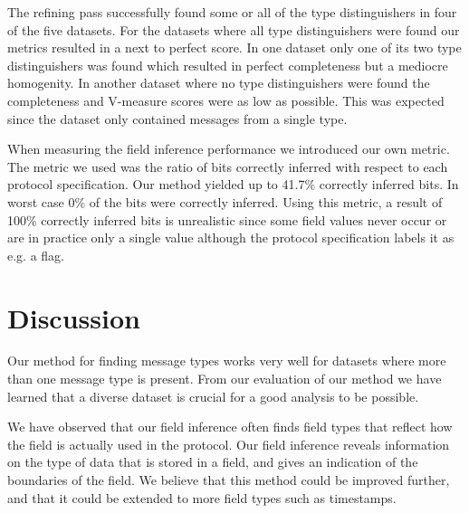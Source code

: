 \documentclass[a4paper,twocolumn]{article}
\begin{document}
The refining pass successfully found some or all of the type distinguishers
in four of the five datasets. For the datasets where all type distinguishers
were found our metrics resulted in a next to perfect score. In one dataset
only one of its two type distinguishers was found which resulted in perfect
completeness but a mediocre homogenity. In another dataset where no
type distinguishers were found the completeness and V-measure scores were as
low as possible. This was expected since the dataset only contained messages
from a single type.

When measuring the field inference performance we introduced our own metric.
The metric we used was the ratio of bits correctly inferred with respect to
each protocol specification. Our method yielded up to 41.7\% correctly
inferred bits. In worst case 0\% of the bits were correctly inferred.
Using this metric, a result of 100\% correctly inferred bits is unrealistic
since some field values never occur or are in practice only a single value
although the protocol specification labels it as e.g. a flag.

\section{Discussion}
Our method for finding message types works very well for datasets where more
than one message type is present. From our evaluation of our method we have
learned that a diverse dataset is crucial for a good analysis to be possible.

We have observed that our field inference often finds field types that reflect
how the field is actually used in the protocol. Our field inference reveals
information on the type of data that is stored in a field, and gives an
indication of the boundaries of the field. We believe that this method could
be improved further, and that it could be extended to more field types such
as timestamps.
\end{document}
